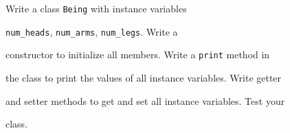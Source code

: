 Write a class \texttt{Being} with instance variables

\texttt{num\_heads}, \texttt{num\_arms}, \texttt{num\_legs}. Write a

constructor to initialize all members. Write a \texttt{print} method in

the class to print the values of all instance variables. Write getter

and setter methods to get and set all instance variables. Test your

class.

